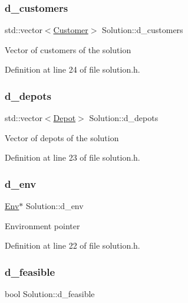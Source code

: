 \subsubsection{\texorpdfstring{d\+\_\+customers}{d\_customers}}
{\footnotesize\ttfamily std\+::vector$<$\hyperlink{class_customer}{Customer}$>$ Solution\+::d\+\_\+customers\hspace{0.3cm}{\ttfamily [private]}}

Vector of customers of the solution 

Definition at line 24 of file solution.\+h.

\mbox{\label{class_solution_a78d6e40ffd00ad0ab0d811ba1cdff377}} 
\subsubsection{\texorpdfstring{d\+\_\+depots}{d\_depots}}
{\footnotesize\ttfamily std\+::vector$<$\hyperlink{class_depot}{Depot}$>$ Solution\+::d\+\_\+depots\hspace{0.3cm}{\ttfamily [private]}}

Vector of depots of the solution 

Definition at line 23 of file solution.\+h.

\mbox{\label{class_solution_a9d210c71836c3d0195c14322d1a59ed8}} 
\subsubsection{\texorpdfstring{d\+\_\+env}{d\_env}}
{\footnotesize\ttfamily \hyperlink{class_env}{Env}$\ast$ Solution\+::d\+\_\+env\hspace{0.3cm}{\ttfamily [private]}}

Environment pointer 

Definition at line 22 of file solution.\+h.

\mbox{\label{class_solution_a195ca2bc3ad2abee9346ddb40bd324c1}} 
\subsubsection{\texorpdfstring{d\+\_\+feasible}{d\_feasible}}
{\footnotesize\ttfamily bool Solution\+::d\+\_\+feasible\hspace{0.3cm}{\ttfamily [private]}}

